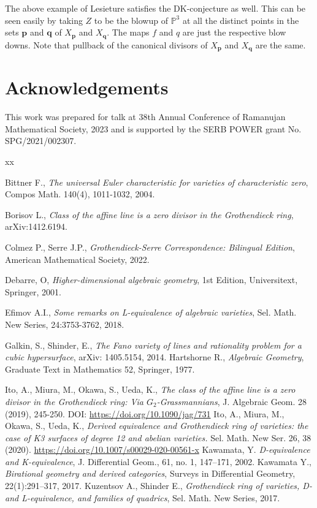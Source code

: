 \documentclass[a4, 11pt]{amsart}
\def \P{\mathbb P}
\begin{document}
The above example of Lesieture satisfies the DK-conjecture as well. This can be seen easily by taking $Z$ to be the blowup of $\P^3$ at all the distinct points in the sets $\textbf{p}$ and $\textbf{q}$ of $X_{\textbf{p}}$ and $X_{\textbf{q}}$. The maps $f$ and $q$ are just the respective blow downs. Note that pullback of the canonical divisors of $X_{\textbf{p}}$ and $X_{\textbf{q}}$ are the same. 

\section*{Acknowledgements}
This work was prepared for talk at 38th Annual Conference of
Ramanujan Mathematical Society, 2023 and is supported by the SERB POWER grant No. SPG/2021/002307. 


\begin{thebibliography}{xx}

 Bittner F., {\it The universal Euler characteristic for varieties of characteristic zero}, Compos Math. 140(4), 1011-1032, 2004.

 Borisov L., {\it Class of the affine line is a zero divisor in the Grothendieck ring}, arXiv:1412.6194.

 Colmez P., Serre J.P., {\it Grothendieck-Serre Correspondence: Bilingual Edition}, American Mathematical Society, 2022.

 Debarre, O, {\it Higher-dimensional algebraic geometry}, 1st Edition, Universitext, Springer, 2001. 

 Efimov A.I., {\it Some remarks on L-equivalence of algebraic varieties}, Sel. Math. New Series, 24:3753-3762, 2018.
 
 Galkin, S., Shinder, E., {\it The Fano variety of lines and rationality problem for a cubic hypersurface}, arXiv: 1405.5154, 2014.
 Hartshorne R., {\it Algebraic Geometry}, Graduate Text in Mathematics 52, Springer, 1977.


 Ito, A., Miura, M., Okawa, S.,  Ueda, K., {\it The class of the affine line is a zero divisor in the Grothendieck ring: Via $G_2$-Grassmannians}, J. Algebraic Geom. 28 (2019), 245-250. DOI: \url{https://doi.org/10.1090/jag/731}
 Ito, A., Miura, M., Okawa, S., Ueda, K., {\it Derived equivalence and Grothendieck ring of varieties: the case of K3 surfaces of degree 12 and abelian varieties.} Sel. Math. New Ser. 26, 38 (2020). \url{https://doi.org/10.1007/s00029-020-00561-x}
 Kawamata, Y. {\it D-equivalence and K-equivalence}, J. Differential Geom., 61, no. 1, 147–171, 2002. 
 Kawamata Y., {\it Birational geometry and derived categories}, Surveys in Differential Geometry, 22(1):291–317, 2017.
 Kuzentsov A., Shinder E., {\it Grothendieck ring of varieties, D- and L-equivalence, and families of quadrics}, Sel. Math. New Series, 2017. 



\end{thebibliography}
\end{document}
